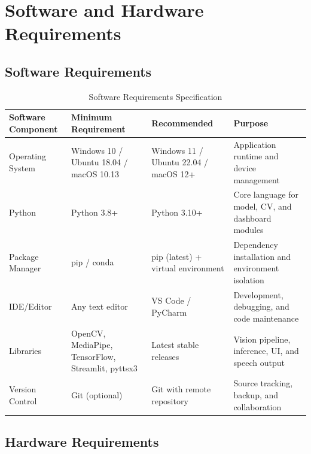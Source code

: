 \section{Software and Hardware Requirements}

\subsection{Software Requirements}

\begin{table}[H]
\centering
\begin{tabular}{|p{3.2cm}|p{4cm}|p{2.4cm}|p{4.2cm}|}
\hline
\textbf{Software Component} & \textbf{Minimum Requirement} & \textbf{Recommended} & \textbf{Purpose} \\
\hline
Operating System & Windows 10 / Ubuntu 18.04 / macOS 10.13 & Windows 11 / Ubuntu 22.04 / macOS 12+ & Application runtime and device management \\
\hline
Python & Python 3.8+ & Python 3.10+ & Core language for model, CV, and dashboard modules \\
\hline
Package Manager & pip / conda & pip (latest) + virtual environment & Dependency installation and environment isolation \\
\hline
IDE/Editor & Any text editor & VS Code / PyCharm & Development, debugging, and code maintenance \\
\hline
Libraries & OpenCV, MediaPipe, TensorFlow, Streamlit, pyttsx3 & Latest stable releases & Vision pipeline, inference, UI, and speech output \\
\hline
Version Control & Git (optional) & Git with remote repository & Source tracking, backup, and collaboration \\
\hline
\end{tabular}
\caption{Software Requirements Specification}
\end{table}

\subsection{Hardware Requirements}

